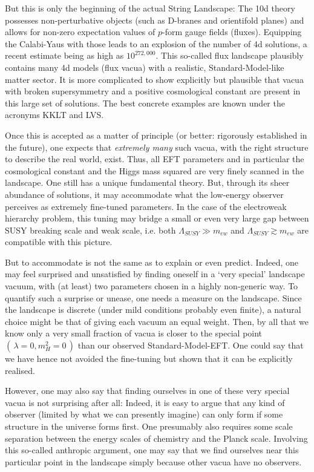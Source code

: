 \documentclass[12pt]{article}
\numberwithin{equation}{section}
\begin{document}
But this is only the beginning of the actual String Landscape: The 10d theory possesses non-perturbative objects (such as D-branes and orientifold planes) and allows for non-zero expectation values of $p$-form gauge fields (fluxes). Equipping the Calabi-Yaus with those leads to an explosion of the number of 4d solutions, a recent estimate being as high as $10^{272,000}$. This so-called flux landscape plausibly contains many 4d models (flux vacua) with a realistic, Standard-Model-like matter sector. It is more complicated to show explicitly but plausible that vacua with broken supersymmetry and a positive cosmological constant are present in this large set of solutions. The best concrete examples are known under the acronyms KKLT and LVS.

Once this is accepted as a matter of principle (or better: rigorously established in the future), one expects that {\it extremely many} such vacua, with the right structure to describe the real world, exist. Thus, all EFT parameters and in particular the cosmological constant and the Higgs mass squared are very finely scanned in the landscape. One still has a unique fundamental theory. But, through its sheer abundance of solutions, it may accommodate what the low-energy observer perceives as extremely fine-tuned parameters. In the case of the electroweak hierarchy problem, this tuning may bridge a small or even very large gap between SUSY breaking scale and weak scale, i.e. both $\Lambda_{SUSY}\gg m_{ew}$ and $\Lambda_{SUSY}\gtrsim m_{ew}$ are compatible with this picture.

But to accommodate is not the same as to explain or even predict. Indeed, one may feel surprised and unsatisfied by finding oneself in a `very special' landscape vacuum, with (at least) two parameters chosen in a highly non-generic way.  To quantify such a surprise or unease, one needs a measure on the landscape. Since the landscape is discrete (under mild conditions probably even finite), a natural choice might be that of giving each vacuum an equal weight. Then, by all that we know only a very small fraction of vacua is closer to the special point $(\,\lambda=0, m_H^2=0\,)$ than our observed Standard-Model-EFT. One could say that we have hence not avoided the fine-tuning but shown that it can be explicitly realised. 

However, one may also say that finding ourselves in one of these very special vacua is not surprising after all: Indeed, it is easy to argue that any kind of observer (limited by what we can presently imagine) can only form if some structure in the universe forms first. One presumably also requires some scale separation between the energy scales of chemistry and the Planck scale. Involving this so-called anthropic argument, one may say that we find ourselves near this particular point in the landscape simply because other vacua have no observers.
\end{document}
